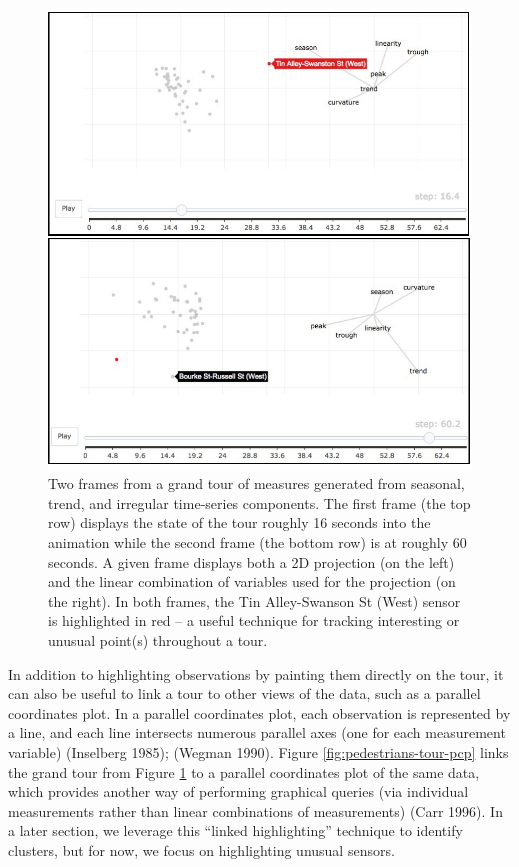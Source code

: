 \documentclass[12pt,]{article}
\theoremstyle{definition}
\theoremstyle{definition}
\theoremstyle{remark}
\begin{document}
\begin{figure}
\centering
\includegraphics{images/pedestrians-tour.pdf}
\caption{\label{fig:pedestrians-tour}Two frames from a grand tour of
measures generated from seasonal, trend, and irregular time-series
components. The first frame (the top row) displays the state of the tour
roughly 16 seconds into the animation while the second frame (the bottom
row) is at roughly 60 seconds. A given frame displays both a 2D
projection (on the left) and the linear combination of variables used
for the projection (on the right). In both frames, the Tin Alley-Swanson
St (West) sensor is highlighted in red -- a useful technique for
tracking interesting or unusual point(s) throughout a tour.}
\end{figure}

In addition to highlighting observations by painting them directly on
the tour, it can also be useful to link a tour to other views of the
data, such as a parallel coordinates plot. In a parallel coordinates
plot, each observation is represented by a line, and each line
intersects numerous parallel axes (one for each measurement variable)
(Inselberg 1985); (Wegman 1990). Figure \ref{fig:pedestrians-tour-pcp}
links the grand tour from Figure \ref{fig:pedestrians-tour} to a
parallel coordinates plot of the same data, which provides another way
of performing graphical queries (via individual measurements rather than
linear combinations of measurements) (Carr 1996). In a later section, we
leverage this ``linked highlighting'' technique to identify clusters,
but for now, we focus on highlighting unusual sensors.
\end{document}
